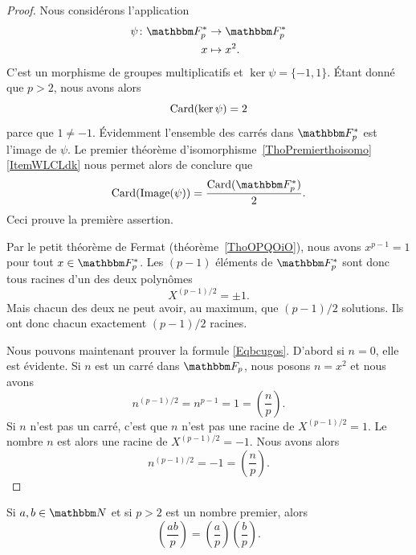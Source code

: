 \begin{proof}
    Nous considérons l'application
    \begin{equation}
        \begin{aligned}
            \psi\colon \eF^*_p&\to \eF^*_p \\
            x&\mapsto x^2.
        \end{aligned}
    \end{equation}
    C'est un morphisme de groupes multiplicatifs et \( \ker\psi=\{ -1,1 \}\). Étant donné que \( p>2\), nous avons alors
    \begin{equation}
        \operatorname{Card}(\ker\psi)=2
    \end{equation}
    parce que \( 1\neq -1\). Évidemment l'ensemble des carrés dans \( \eF^*_p\) est l'image de \( \psi\). Le premier théorème d'isomorphisme~\ref{ThoPremierthoisomo}\ref{ItemWLCLdk} nous permet alors de conclure que
    \begin{equation}
        \Card(\Image(\psi))=\frac{ \Card(\eF^*_p) }{2}.
    \end{equation}
    Ceci prouve la première assertion.

    Par le petit théorème de Fermat (théorème~\ref{ThoOPQOiO}), nous avons \( x^{p-1}=1\) pour tout \( x\in \eF^*_p\). Les \( (p-1)\) éléments de \( \eF^*_p\) sont donc tous racines d'un des deux polynômes
    \begin{equation}
        X^{(p-1)/2}=\pm 1.
    \end{equation}
    Mais chacun des deux ne peut avoir, au maximum, que \( (p-1)/2\) solutions. Ils ont donc chacun exactement \( (p-1)/2\) racines.

    Nous pouvons maintenant prouver la formule \eqref{Eqbcugos}. D'abord si \( n=0\), elle est évidente. Si \( n\) est un carré dans \( \eF_p\), nous posons \( n=x^2\) et nous avons
    \begin{equation}
        n^{(p-1)/2}=n^{p-1}=1=\left(\frac{n}{p}\right).
    \end{equation}
    Si \( n\) n'est pas un carré, c'est que \( n\) n'est pas une racine de \( X^{(p-1)/2}=1\). Le nombre \( n\) est alors une racine de \( X^{(p-1)/2}=-1\). Nous avons alors
    \begin{equation}
        n^{(p-1)/2}=-1=\left(\frac{n}{p}\right).
    \end{equation}
\end{proof}

\begin{corollary}   \label{CoruJosNz}
    Si \( a,b\in \eN\) et si \( p>2\) est un nombre premier, alors
    \begin{equation}
        \left(\frac{ab}{p}\right)=\left(\frac{a}{p}\right)\left(\frac{b}{p}\right).
    \end{equation}
\end{corollary}

